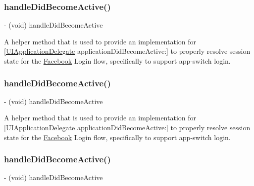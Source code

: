 \subsubsection{\texorpdfstring{handle\+Did\+Become\+Active()}{handleDidBecomeActive()}\hspace{0.1cm}{\footnotesize\ttfamily [2/5]}}
{\footnotesize\ttfamily -\/ (void) handle\+Did\+Become\+Active \begin{DoxyParamCaption}{ }\end{DoxyParamCaption}}

A helper method that is used to provide an implementation for \mbox{[}\hyperlink{classUIApplicationDelegate-p}{U\+I\+Application\+Delegate} application\+Did\+Become\+Active\+:\mbox{]} to properly resolve session state for the \hyperlink{interfaceFacebook}{Facebook} Login flow, specifically to support app-\/switch login. \mbox{\label{interfaceFBSession_a647536f4770fc746b6865ad610779767}} 
\subsubsection{\texorpdfstring{handle\+Did\+Become\+Active()}{handleDidBecomeActive()}\hspace{0.1cm}{\footnotesize\ttfamily [3/5]}}
{\footnotesize\ttfamily -\/ (void) handle\+Did\+Become\+Active \begin{DoxyParamCaption}{ }\end{DoxyParamCaption}}

A helper method that is used to provide an implementation for \mbox{[}\hyperlink{classUIApplicationDelegate-p}{U\+I\+Application\+Delegate} application\+Did\+Become\+Active\+:\mbox{]} to properly resolve session state for the \hyperlink{interfaceFacebook}{Facebook} Login flow, specifically to support app-\/switch login. \mbox{\label{interfaceFBSession_a647536f4770fc746b6865ad610779767}} 
\subsubsection{\texorpdfstring{handle\+Did\+Become\+Active()}{handleDidBecomeActive()}\hspace{0.1cm}{\footnotesize\ttfamily [4/5]}}
{\footnotesize\ttfamily -\/ (void) handle\+Did\+Become\+Active \begin{DoxyParamCaption}{ }\end{DoxyParamCaption}}

